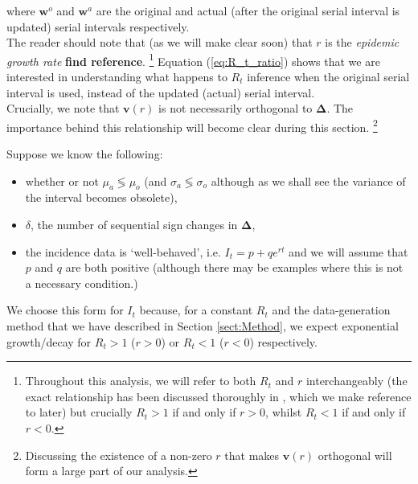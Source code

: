 \documentclass[10pt,journal,compsoc]{IEEEtran}
\begin{document}
where $\boldsymbol{w}^o$ and $\boldsymbol{w}^a$ are the original and actual (after the original serial interval is updated) serial intervals respectively.\\
The reader should note that (as we will make clear soon) that $r$ is the \textit{epidemic growth rate} \textbf{find reference}. \footnote{Throughout this analysis, we will refer to both $R_t$ and $r$ interchangeably (the exact relationship has been discussed thoroughly in \cite{Wallinga-Lipsitch}, which we make reference to later) but crucially $R_t>1$ if and only if $r>0$, whilst $R_t<1$ if and only if $r<0$.}
Equation (\ref{eq:R_t_ratio}) shows that we are interested in understanding what happens to $R_t$ inference when the original serial interval is used, instead of the updated (actual) serial interval.\\
Crucially, we note that $\boldsymbol{v}(r)$ is not necessarily orthogonal to $\boldsymbol{\Delta}$. The importance behind this relationship will become clear during this section. \footnote{Discussing the existence of a non-zero $r$ that makes $\boldsymbol{v}(r)$ orthogonal will form a large part of our analysis.}

Suppose we know the following:

\begin{itemize}
    \item whether or not $\mu_a \mathop{\lessgtr} \mu_o $ (and $\sigma_a \mathop{\lessgtr} \sigma_o$ although as we shall see the variance of the interval becomes obsolete),
    \item $\delta$, the number of sequential sign changes in $\boldsymbol{\Delta}$,
    \item the incidence data is `well-behaved', i.e. $I_t = p+qe^{rt}$ and we will assume that $p$ and $q$ are both positive (although there may be examples where this is not a necessary condition.)
\end{itemize}

We choose this form for $I_t$ because, for a constant $R_t$ and the data-generation method that we have described in Section \ref{sect:Method}, we expect exponential growth/decay for $R_t>1$ ($r>0$) or $R_t<1$ ($r<0$) respectively.\\
\end{document}

